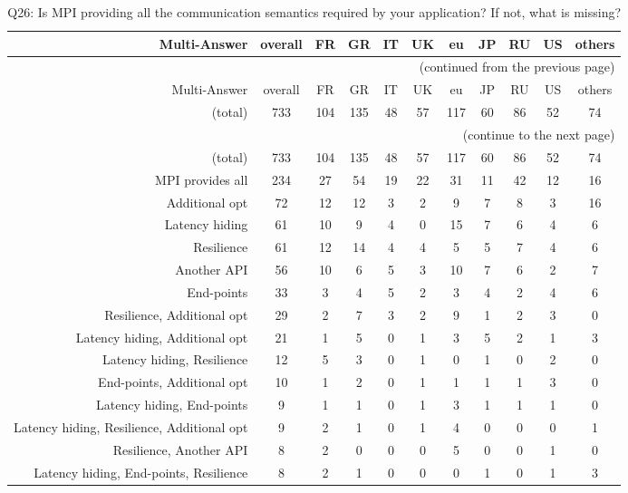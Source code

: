 \clearpage%
{\footnotesize\begin{landscape}%
\begin{longtable}[htb]{r|c|c|c|c|c|c|c|c|c|c}%
\caption{Q26: Is MPI providing all the communication semantics required by your application? If not, what is missing?}%
\label{tab:Q26-mans} \\%
\hline%
Multi-Answer & overall & FR & GR & IT & UK & eu & JP & RU & US & others \\
 \hline%
\endfirsthead%
\multicolumn{11}{r}{(continued from the previous page)}\\%
\hline%
Multi-Answer & overall & FR & GR & IT & UK & eu & JP & RU & US & others \\
 \hline%
\endhead%
\hline%
(total) & 733 & 104 & 135 & 48 & 57 & 117 & 60 & 86 & 52 & 74 \\%
\hline%
\multicolumn{11}{r}{(continue to the next page)}\\%
\endfoot%
\hline%
(total) & 733 & 104 & 135 & 48 & 57 & 117 & 60 & 86 & 52 & 74 \\%
\hline%
\endlastfoot%
\hline%
{MPI provides all} & 234 & 27 & 54 & 19 & 22 & 31 & 11 & 42 & 12 & 16 \\%
{Additional opt} & 72 & 12 & 12 & 3 & 2 & 9 & 7 & 8 & 3 & 16 \\%
{Latency hiding} & 61 & 10 & 9 & 4 & 0 & 15 & 7 & 6 & 4 & 6 \\%
{Resilience} & 61 & 12 & 14 & 4 & 4 & 5 & 5 & 7 & 4 & 6 \\%
{Another API} & 56 & 10 & 6 & 5 & 3 & 10 & 7 & 6 & 2 & 7 \\%
{End-points} & 33 & 3 & 4 & 5 & 2 & 3 & 4 & 2 & 4 & 6 \\%
{Resilience, Additional opt} & 29 & 2 & 7 & 3 & 2 & 9 & 1 & 2 & 3 & 0 \\%
{Latency hiding, Additional opt} & 21 & 1 & 5 & 0 & 1 & 3 & 5 & 2 & 1 & 3 \\%
{Latency hiding, Resilience} & 12 & 5 & 3 & 0 & 1 & 0 & 1 & 0 & 2 & 0 \\%
{End-points, Additional opt} & 10 & 1 & 2 & 0 & 1 & 1 & 1 & 1 & 3 & 0 \\%
{Latency hiding, End-points} & 9 & 1 & 1 & 0 & 1 & 3 & 1 & 1 & 1 & 0 \\%
{Latency hiding, Resilience, Additional opt} & 9 & 2 & 1 & 0 & 1 & 4 & 0 & 0 & 0 & 1 \\%
{Resilience, Another API} & 8 & 2 & 0 & 0 & 0 & 5 & 0 & 0 & 1 & 0 \\%
{Latency hiding, End-points, Resilience} & 8 & 2 & 1 & 0 & 0 & 0 & 1 & 0 & 1 & 3 \\%

\end{longtable}
\end{landscape}}
